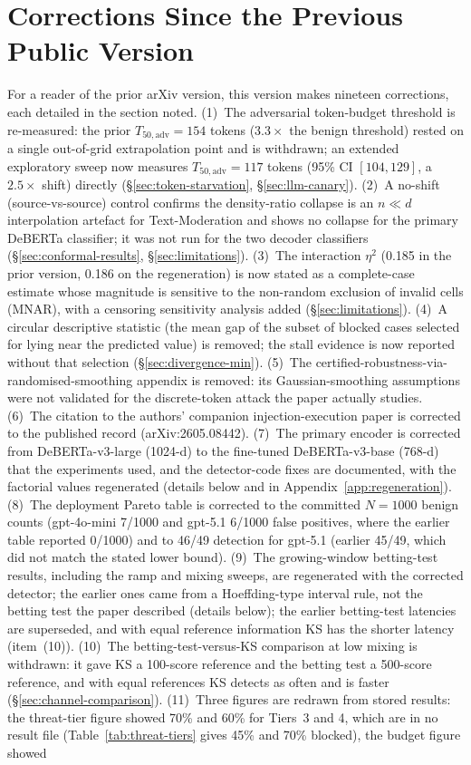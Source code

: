 \documentclass{article}
\begin{document}
\section{Corrections Since the Previous Public Version}
\label{app:corrections}

For a reader of the prior arXiv version, this version makes nineteen corrections, each detailed in the section noted. (1)~The adversarial token-budget threshold is re-measured: the prior $T_{50,\text{adv}} = 154$ tokens ($3.3\times$ the benign threshold) rested on a single out-of-grid extrapolation point and is withdrawn; an extended exploratory sweep now measures $T_{50,\text{adv}} = 117$ tokens (95\% CI $[104, 129]$, a $2.5\times$ shift) directly (\S\ref{sec:token-starvation}, \S\ref{sec:llm-canary}). (2)~A no-shift (source-vs-source) control confirms the density-ratio collapse is an $n \ll d$ interpolation artefact for Text-Moderation and shows no collapse for the primary DeBERTa classifier; it was not run for the two decoder classifiers (\S\ref{sec:conformal-results}, \S\ref{sec:limitations}). (3)~The interaction $\eta^2$ (0.185 in the prior version, 0.186 on the regeneration) is now stated as a complete-case estimate whose magnitude is sensitive to the non-random exclusion of invalid cells (MNAR), with a censoring sensitivity analysis added (\S\ref{sec:limitations}). (4)~A circular descriptive statistic (the mean gap of the subset of blocked cases selected for lying near the predicted value) is removed; the stall evidence is now reported without that selection (\S\ref{sec:divergence-min}). (5)~The certified-robustness-via-randomised-smoothing appendix is removed: its Gaussian-smoothing assumptions were not validated for the discrete-token attack the paper actually studies. (6)~The citation to the authors' companion injection-execution paper is corrected to the published record (arXiv:2605.08442). (7)~The primary encoder is corrected from DeBERTa-v3-large (1024-d) to the fine-tuned DeBERTa-v3-base (768-d) that the experiments used, and the detector-code fixes are documented, with the factorial values regenerated (details below and in Appendix~\ref{app:regeneration}). (8)~The deployment Pareto table is corrected to the committed $N{=}1000$ benign counts (gpt-4o-mini 7/1000 and gpt-5.1 6/1000 false positives, where the earlier table reported 0/1000) and to 46/49 detection for gpt-5.1 (earlier 45/49, which did not match the stated lower bound). (9)~The growing-window betting-test results, including the ramp and mixing sweeps, are regenerated with the corrected detector; the earlier ones came from a Hoeffding-type interval rule, not the betting test the paper described (details below); the earlier betting-test latencies are superseded, and with equal reference information KS has the shorter latency (item~(10)). (10)~The betting-test-versus-KS comparison at low mixing is withdrawn: it gave KS a 100-score reference and the betting test a 500-score reference, and with equal references KS detects as often and is faster (\S\ref{sec:channel-comparison}). (11)~Three figures are redrawn from stored results: the threat-tier figure showed 70\% and 60\% for Tiers~3 and 4, which are in no result file (Table~\ref{tab:threat-tiers} gives 45\% and 70\% blocked), the budget figure showed 
\end{document}
